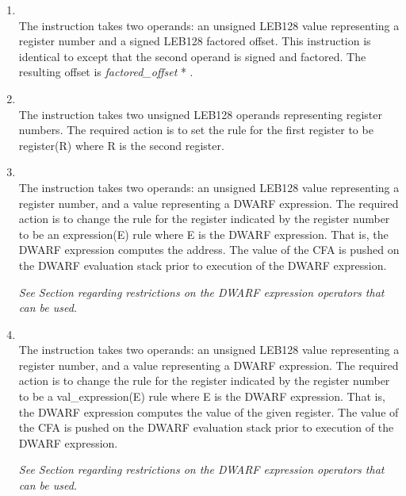 \begin{enumerate}[1. ]
\item \textbf{\DWCFAvaloffsetsfTARG} \\
The \DWCFAvaloffsetsfTARG{} instruction takes two operands: an
unsigned LEB128 value representing a register number and a
signed LEB128 factored offset. This instruction is identical
to \DWCFAvaloffset{} except that the second operand is signed
and factored. The resulting offset is 
\textit{factored\_offset} * .

\item \textbf{\DWCFAregisterTARG} \\
The \DWCFAregisterTARG{} 
instruction takes two unsigned LEB128
operands representing register numbers. The required action
is to set the rule for the first register to be register(R)
where R is the second register.

\item \textbf{\DWCFAexpressionTARG} \\
The \DWCFAexpressionTARG{} instruction takes two operands: an
unsigned LEB128 
value representing a register number, and
a \DWFORMblock{} 
value representing a DWARF expression. 
The
required action is to change the rule for the register
indicated by the register number to be an expression(E)
rule where E is the DWARF expression. That is, the DWARF
expression computes the address. The value of the CFA is
pushed on the DWARF evaluation stack prior to execution of
the DWARF expression.

\textit{See Section  
regarding restrictions on the DWARF
expression operators that can be used.}

\item \textbf{\DWCFAvalexpressionTARG} \\
The \DWCFAvalexpressionTARG{} instruction takes two operands:
an unsigned LEB128 
value representing a register number, and
a \DWFORMblock{} 
value representing a DWARF expression. The
required action is to change the rule for the register
indicated by the register number to be a val\_expression(E)
rule where E is the DWARF expression. That is, the DWARF
expression computes the value of the given register. The value
of the CFA is pushed on the DWARF evaluation stack prior to
execution of the DWARF expression.

\textit{See Section  
regarding restrictions on the DWARF
expression operators that can be used.}


\end{enumerate}
